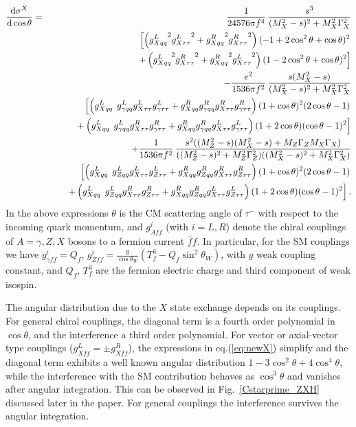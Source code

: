 \documentclass[12pt]{article}
\newcommand\nn{\nonumber}
\begin{document}
\begin{eqnarray}
\frac{{\rm d}\sigma^{X}}{{\rm d}\cos\theta}&= 
& \frac{1} {24576
\pi  f^4}\, \frac{s^3}{(M_X^2-s){}^2+M_X^2 \Gamma _X^2}\nn \\
&&
\phantom{M} \left[\left({g^L_{Xqq}}^2 {g^L_{X\tau \tau}}^2+{g^R_{Xqq}}^2 {g^R_{X\tau \tau}}^2\right)
(-1+2 \cos^2\theta+\cos\theta)^2 \right. \nn \\
&& \phantom{Ma}\left.
+\left({g^L_{Xqq}}^2 {g^R_{X\tau \tau}}^2+{g^R_{Xqq}}^2 {g^L_{X\tau \tau}}^2\right)
(1-2 \cos^2\theta+\cos\theta)^2\right]\nn \\
&&   -\frac{e^2}{1536\pi f^2}\, \frac{ s
  (M_X^2-s)}{
  (M_X^2-s)^2+M_X^2 \Gamma _X^2}\nn \\
 && 
 \phantom{M} \left[\left({g^L_{Xqq}}^{\phantom{1}} g^L_{\gamma qq}g^L_{X\tau\tau} g^L_{\gamma \tau \tau }
  +g^R_{Xqq} g^R_{\gamma qq}g^R_{X\tau\tau} g^R_{\gamma \tau \tau}\right)
(1+\cos\theta)^2 (2 \cos\theta-1) \right. \nn \\
&& \phantom{Ma} \left. 
+\left({g^L_{Xqq}}^{\phantom{1}} g^L_{\gamma qq}g^R_{X\tau\tau} g^R_{\gamma \tau \tau}
  +g^R_{Xqq} g^R_{\gamma qq}g^L_{X\tau\tau} g^L_{\gamma \tau \tau}\right)
  (1+2 \cos\theta) (\cos\theta-1)^2\right]\nn \\
&&  +\frac{1}{1536\pi f^2}\,\frac{s^2 ((M^2_Z-s)(M_X^2-s)+M_Z\Gamma_Z M_X \Gamma _X) }
  {((M_Z^2-s)^2 
  +M_Z^2 \Gamma_Z^2)
((M_X^2-s){}^2+M_X^2 \Gamma _X^2)}\nn \\
&&\phantom{M}
\left[\left({g^L_{Xqq}}^{\phantom{1}} g^L_{Zqq}g^L_{X\tau\tau} g^L_{Z\tau\tau}+
g^R_{Xqq} g^R_{Zqq}g^R_{X\tau\tau} g^R_{Z\tau\tau}\right)
(1+\cos\theta)^2 (2 \cos\theta-1) \right. \nn \\
&&\phantom{Ma} \left.
+\left({g^L_{Xqq}}^{\phantom{1}} g^L_{Zqq}g^R_{X\tau\tau} g^R_{Z\tau\tau}+
g^R_{Xqq} g^R_{Zqq}g^L_{X\tau\tau} g^L_{Z\tau\tau}\right)
 (1+2 \cos\theta) (\cos\theta-1)^2\right].\label{eq:newX}
\end{eqnarray}
In the above expressions $\theta$ is the CM scattering angle of $\tau^-$ with respect to the incoming quark momentum, 
and $g_{Aff}^i$ (with $i=L,R$) denote the chiral couplings of $A=\gamma,Z,X$ bosons to a fermion  current $\bar f f$.  
In particular, for the SM couplings we have $g^i_{\gamma ff}=Q_f$, $g^i_{Zff}= \frac{g}{\cos\theta_W}(T_f^3-Q_f \sin^2\theta_W)$, 
with $g$ weak coupling constant, and $Q_f,\, T^3_f$ are the fermion electric charge and third component of weak isospin.  

The angular distribution due to the $X$ state exchange depends on its couplings. 
For general chiral couplings, the diagonal term is a fourth order polynomial in 
$\cos\theta$, and the interference  a third order polynomial. For vector or axial-vector 
type couplings ($g_{Xff}^L=\pm g_{Xff}^R$), the expressions in eq.(\ref{eq:newX}) simplify and the diagonal term 
exhibits a well known angular distribution $1-3\cos^2\theta+4\cos^4\theta$, while 
the interference with the SM contribution behaves as $\cos^3\theta$ 
and vanishes after angular integration. 
This can be observed in Fig.~\ref{Cstarprime_ZXH}  discussed later in the paper. For general couplings the interference survives the angular integration.
\end{document}
